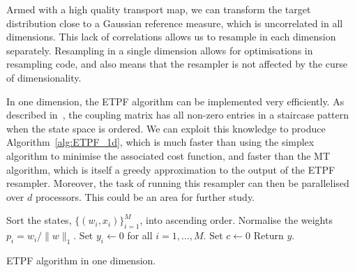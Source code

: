 \documentclass[final]{siamltex}
\begin{document}
Armed with a high quality transport map, we can transform the target
distribution close to a Gaussian reference measure, which is
uncorrelated in all dimensions. This lack of correlations allows us to
resample in each dimension separately. Resampling in a
single dimension allows for optimisations in resampling code, and also
means that the resampler is not affected by the curse of
dimensionality. 

In one
dimension, the ETPF algorithm can be implemented very efficiently. As
described in~\cite{reich2013nonparametric}, the coupling matrix has
all non-zero entries in a staircase pattern when the state space is
ordered. We can exploit this knowledge to produce
Algorithm~\ref{alg:ETPF_1d}, which is much faster than using the
simplex algorithm to minimise the associated cost function, and faster
than the MT algorithm\cite{cotter2015parallel}, which is itself a
greedy approximation to the output of the ETPF resampler. Moreover, the task of
running this resampler can then be parallelised over $d$
processors. This could be an area for further study.

\begin{table}[!htpb]
\begin{algorithm}[H]
\DontPrintSemicolon
\BlankLine
Sort the states, $\{(w_i, x_i)\}_{i=1}^M$, into ascending order.\;
Normalise the weights $p_i = w_i/\|w\|_1$.\;
Set $y_i \leftarrow 0$ for all $i=1,\dots,M$.\;
Set $c \leftarrow 0$\;
Return $y$.\;
\caption{ETPF algorithm in one dimension.\label{alg:ETPF_1d}}
\end{algorithm}
\end{table}

\end{document}
